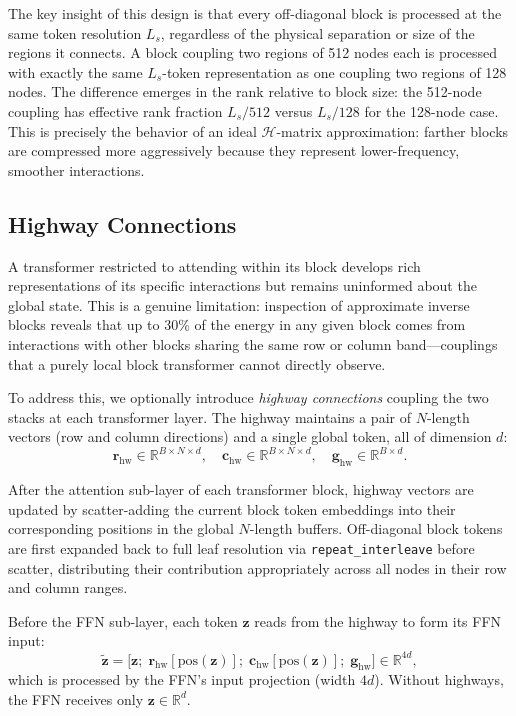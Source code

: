 \documentclass[acmtog,anonymous,review]{acmart}
\begin{document}
The key insight of this design is that every off-diagonal block is processed at the same token
resolution $L_s$, regardless of the physical separation or size of the regions it connects.  A
block coupling two regions of 512 nodes each is processed with exactly the same $L_s$-token
representation as one coupling two regions of 128 nodes.  The difference emerges in the rank
relative to block size: the 512-node coupling has effective rank fraction $L_s/512$ versus
$L_s/128$ for the 128-node case.  This is precisely the behavior of an ideal $\mathcal{H}$-matrix
approximation: farther blocks are compressed more aggressively because they represent lower-frequency,
smoother interactions.

\subsection{Highway Connections}
\label{sec:method:highways}

A transformer restricted to attending within its block develops rich representations of its specific
interactions but remains uninformed about the global state.  This is a genuine limitation:
inspection of approximate inverse blocks reveals that up to 30\% of the energy in any given block
comes from interactions with other blocks sharing the same row or column band---couplings that a
purely local block transformer cannot directly observe.

To address this, we optionally introduce \emph{highway connections} coupling the two stacks at
each transformer layer.  The highway maintains a pair of $N$-length vectors (row and column
directions) and a single global token, all of dimension $d$:
\[
  \mathbf{r}_\mathrm{hw} \in \mathbb{R}^{B \times N \times d}, \quad
  \mathbf{c}_\mathrm{hw} \in \mathbb{R}^{B \times N \times d}, \quad
  \mathbf{g}_\mathrm{hw} \in \mathbb{R}^{B \times d}.
\]

After the attention sub-layer of each transformer block, highway vectors are updated by
scatter-adding the current block token embeddings into their corresponding positions in the global
$N$-length buffers.  Off-diagonal block tokens are first expanded back to full leaf resolution via
\texttt{repeat\_interleave} before scatter, distributing their contribution appropriately across
all nodes in their row and column ranges.

Before the FFN sub-layer, each token $\mathbf{z}$ reads from the highway to form its FFN input:
\begin{equation}
  \tilde{\mathbf{z}} = \bigl[\mathbf{z};\;
    \mathbf{r}_\mathrm{hw}[\mathrm{pos}(\mathbf{z})];\;
    \mathbf{c}_\mathrm{hw}[\mathrm{pos}(\mathbf{z})];\;
    \mathbf{g}_\mathrm{hw}\bigr] \in \mathbb{R}^{4d},
  \label{eq:highway_concat}
\end{equation}
which is processed by the FFN's input projection (width $4d$).  Without highways, the FFN
receives only $\mathbf{z} \in \mathbb{R}^d$.
\end{document}

